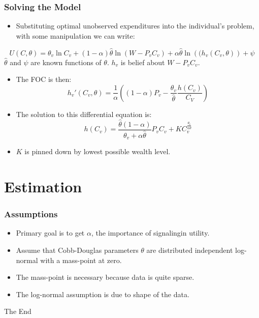 \documentclass{beamer}
\begin{document}
%
\begin{frame}
  \frametitle{Solving the Model}
  \begin{itemize}
    \item Substituting optimal unobserved expenditures into the individual's problem, with some manipulation we can write:
  \end{itemize}
      \[
	U(C,\theta) = \theta_v \ln C_v + \left(1-\alpha \right)\hat{\theta} \ln (W-P_v C_v)  + \alpha \hat{\theta} \ln\left((h_v(C_v,\theta)\right) + \psi
      \]
      \hspace{.75cm} $\hat{\theta}$ and $\psi$ are known functions of $\theta$. $h_v$ is belief about $W-P_v C_v$.
      \begin{itemize}
    \item The FOC is then:
      \[
	h_v'(C_v,\theta) = \frac{1}{\alpha}\left(\left( 1-\alpha \right)P_v-\frac{\theta_v}{\hat{\theta}}\frac{h(C_v)}{C_V}  \right)	
      \]
    \item The solution to this differential equation is:
      \[
	h(C_v) = \frac{\hat{\theta}(1-\alpha)}{\theta_v + \alpha \hat{\theta}}P_v C_v + K C_v^{\frac{\theta_v}{\alpha \hat{\theta}}} 
      \]
    \item $K$ is pinned down by lowest possible wealth level.
  \end{itemize}
 \end{frame}
 \section{Estimation}
\begin{frame}
  \frametitle{Assumptions}
  \begin{itemize}
    \item Primary goal is to get $\alpha$, the importance of signalingin utility.
    \item Assume that Cobb-Douglas parameters $\theta$ are distributed independent log-normal with a mass-point at zero.
    \item The mass-point is necessary because data is quite sparse.
    \item The log-normal assumption is due to shape of the data.
  \end{itemize}
 \end{frame}
%  
 \begin{frame}
   \centerline{The End}
 \end{frame}
 
\end{document}
